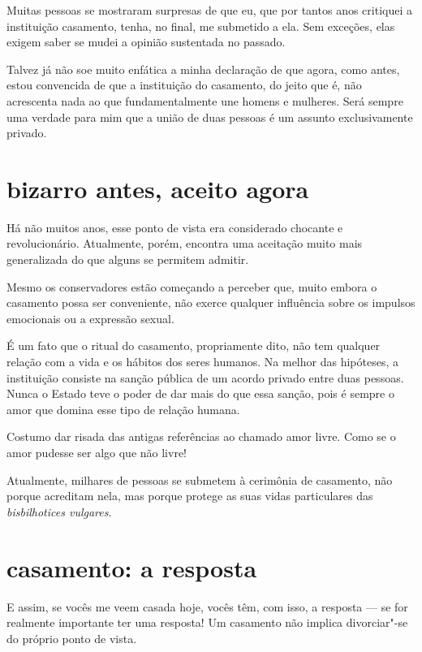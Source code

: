 \begin{center}
\end{center}

Muitas pessoas se mostraram surpresas de que eu, que por tantos anos
critiquei a instituição casamento, tenha, no final, me submetido a ela. Sem exceções, elas exigem saber se mudei a opinião sustentada no
passado.

Talvez já não soe muito enfática a minha declaração de que agora, como
antes, estou convencida de que a instituição do casamento, do jeito que
é, não acrescenta nada ao que fundamentalmente une homens e mulheres.
Será sempre uma verdade para mim que a união de duas pessoas é um
assunto exclusivamente privado.

\section{bizarro antes, aceito agora}

Há não muitos anos, esse ponto de vista era considerado chocante e
revolucionário. Atualmente, porém, encontra uma aceitação muito mais
generalizada do que alguns se permitem admitir.

Mesmo os conservadores estão começando a perceber que, muito embora o
casamento possa ser conveniente, não exerce qualquer influência sobre os
impulsos emocionais ou a expressão sexual.

É um fato que o ritual do casamento, propriamente dito, não tem qualquer
relação com a vida e os hábitos dos seres humanos. Na melhor das
hipóteses, a instituição consiste na sanção pública de um acordo privado
entre duas pessoas. Nunca o Estado teve o poder de dar mais do que essa
sanção, pois é sempre o amor que domina esse tipo de relação humana.

Costumo dar risada das antigas referências ao chamado amor livre. Como
se o amor pudesse ser algo que não livre!

Atualmente, milhares de pessoas se submetem à cerimônia de casamento,
não porque acreditam nela, mas porque protege as suas vidas particulares
das \textit{bisbilhotices vulgares}.

\section{casamento: a resposta}

E assim, se vocês me veem casada hoje, vocês têm, com isso, a resposta --- se
for realmente importante ter uma resposta! Um casamento não implica
divorciar"-se do próprio ponto de vista.

